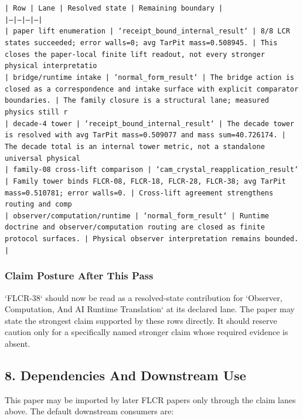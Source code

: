 \documentclass[11pt]{article}
\begin{document}
\noindent\texttt{| Row | Lane | Resolved state | Remaining boundary |}\\
\noindent\texttt{|---|---|---|---|}\\
\noindent\texttt{| paper lift enumeration | `receipt\_bound\_internal\_result` | 8/8 LCR states succeeded; error walls=0; avg TarPit mass=0.508945. | This closes the paper-local finite lift readout, not every stronger physical interpretatio}\\
\noindent\texttt{| bridge/runtime intake | `normal\_form\_result` | The bridge action is closed as a correspondence and intake surface with explicit comparator boundaries. | The family closure is a structural lane; measured physics still r}\\
\noindent\texttt{| decade-4 tower | `receipt\_bound\_internal\_result` | The decade tower is resolved with avg TarPit mass=0.509077 and mass sum=40.726174. | The decade total is an internal tower metric, not a standalone universal physical }\\
\noindent\texttt{| family-08 cross-lift comparison | `cam\_crystal\_reapplication\_result` | Family tower binds FLCR-08, FLCR-18, FLCR-28, FLCR-38; avg TarPit mass=0.510781; error walls=0. | Cross-lift agreement strengthens routing and comp}\\
\noindent\texttt{| observer/computation/runtime | `normal\_form\_result` | Runtime doctrine and observer/computation routing are closed as finite protocol surfaces. | Physical observer interpretation remains bounded. |}\\

\subsubsection*{Claim Posture After This Pass}

`FLCR-38` should now be read as a resolved-state contribution for `Observer, Computation, And AI Runtime Translation` at its declared lane. The paper may state the strongest claim supported by these rows directly. It should reserve caution only for a specifically named stronger claim whose required evidence is absent.

\subsection*{8. Dependencies And Downstream Use}

This paper may be imported by later FLCR papers only through the claim lanes
above. The default downstream consumers are:
\end{document}
